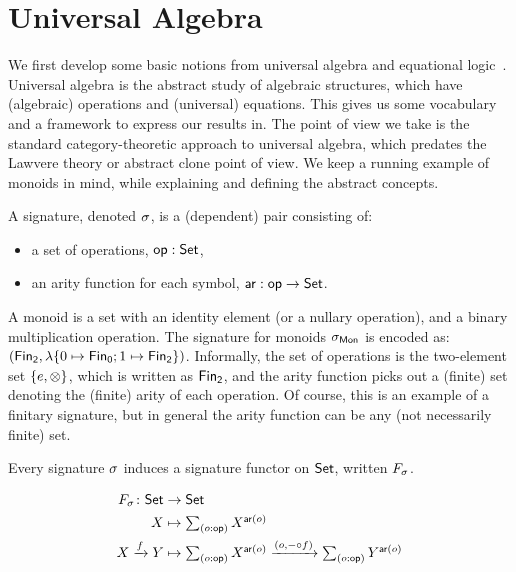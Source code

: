 \section{Universal Algebra}
\label{sec:universal-algebra}

We first develop some basic notions from universal algebra and equational
logic~\cite{birkhoffStructureAbstractAlgebras1935}.
%
Universal algebra is the abstract study of algebraic structures, which have (algebraic) operations and (universal)
equations.
%
This gives us some vocabulary and a framework to express our results in.
%
The point of view we take is the standard category-theoretic approach to universal algebra, which predates the Lawvere
theory or abstract clone point of view.
%
We keep a running example of monoids in mind, while explaining and defining the abstract concepts.

\begin{definition}[Signature]
    A signature, denoted $\sigma$, is a (dependent) pair consisting of:
    \begin{itemize}
        \item a set of operations, $\operatorname{\mathsf{op}} : \mathsf{Set}$,
        \item an arity function for each symbol, $\operatorname{\mathsf{ar}} : \operatorname{\mathsf{op}} \to \mathsf{Set}$.
    \end{itemize}
\end{definition}

\begin{example}
    A monoid is a set with an identity element (or a nullary operation), and a binary multiplication operation.
    The signature for monoids $\sigma_{\mathsf{Mon}}$ is encoded as:
    $(\Fin[2],\lambda \{0 \mapsto \Fin[0] ; 1 \mapsto \Fin[2] \})$.
    Informally, the set of operations is the two-element set $\{e,\otimes\}$, which is written as $\Fin[2]$,
    and the arity function picks out a (finite) set denoting the (finite) arity of each operation.
    Of course, this is an example of a finitary signature,
    but in general the arity function can be any (not necessarily finite) set.
\end{example}

Every signature $\sigma$ induces a signature functor on $\mathsf{Set}$, written $\Sig$.

\begin{definition}
    \begin{align*}
        \Sig \colon \Set & \to \Set                         \\
        X                & \mapsto \dsum{o:\op}{X^{\ar(o)}} \\
        X \xto{f} Y      & \mapsto
        \dsum{o:\op}{X^{\ar(o)}}
        \xto{(o, \blank \comp f)}
        \dsum{o:\op}{Y^{\ar(o)}}
    \end{align*}
\end{definition}

